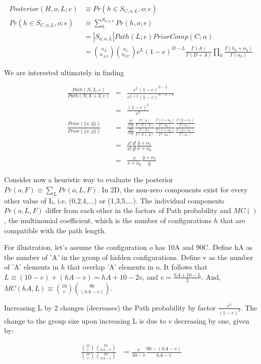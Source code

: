 \documentclass{article}
\begin{document}
\begin{align}
  Posterior(H,o,L;e) & \equiv Pr(h \in S_{C,o,L},o;e) \\
  Pr(h \in S_{C,o,L}, o; e) & \equiv \sum_h^{S_{a,o,L}} Pr(h, o; e) \nonumber \\
  & = |S_{a,o,L}| Path(L;e) PriorComp(C;\alpha) \nonumber \\
  & = {o_A \choose n_{AA}}{o_C \choose n_{CC}}
  e^L(1-e)^{D-L}
  \frac{\Gamma(A)}{\Gamma(D+A)}
  \prod_k \frac{\Gamma(h_k+\alpha_k)}{\Gamma(\alpha_k)}
\end{align}

We are interested ultimately in finding


\begin{eqnarray}
  \frac{Path(N,L,e)}{Path(N,L+2,e)}
  & = & \frac{e^L(1-e)^{N-L}}{e^{L+2}(1-e)^{N-L-2}} \nonumber \\
  & = & \frac{(1-e)^2}{e^2} \\[4ex]
  \frac{Prior(\{\check{x},\hat{y}\})}{Prior(\{x,y\})}
  & = &
    \frac{\frac{N!}{\check{x}!\hat{y}!}}{\frac{N!}{x!y!}}
    \frac{\frac{\Gamma(A)}{\Gamma(N+A)}}{\frac{\Gamma(A)}{\Gamma(N+A)}}
    \frac{
      \frac{\Gamma(\check{x}+\alpha_0)}{\Gamma(\alpha_0)}
    }{
      \frac{\Gamma(x+\alpha_0)}{\Gamma(\alpha_0)}
    }
    \frac{
      \frac{\Gamma(\hat{y}+\alpha_1)}{\Gamma(\alpha_1)}
    }{
      \frac{\Gamma(y+\alpha_1)}{\Gamma(\alpha_1)}
    } \nonumber \\[2ex]
    & = &
    \frac{x!}{\check{x}!}
    \frac{y!}{\hat{y}!}
    \frac{\hat{y}+\alpha_1}{x+\alpha_0} \nonumber \\
    & = &
    \frac{x}{x+\alpha_0}
    \frac{\hat{y}+\alpha_1}{\hat{y}}
\end{eqnarray}



Consider now a heuristic way to evaluate the posterior $Pr(o,F) \equiv
\sum_L Pr(o,L,F)$. In 2D, the non-zero components exist for every
other value of L, i.e. (0,2,4,...) or (1,3,5,...). The individual
components $Pr(o,L,F)$ differ from each other in the factors of Path
probability and $MC()$, the multinomial coefficient, which is the number
of configurations $h$ that are compatible with the path
length.

For illustration, let's assume the configuration $o$ has 10A and 90C.
Define hA as the number of 'A' in the group of hidden configurations.
Define v as the number of 'A' elements in $h$ that overlap 'A'
elements in o.  It follows that $L \equiv (10-v) + (hA-v) = hA + 10 -
2v$, and $v = \frac{hA + 10 - L}{2}$.  And, $MC(hA,L) \equiv {10
  \choose v}{90 \choose (hA-v)}$.

Increasing L by 2 changes (decreases) the Path probability by factor
$\frac{e^2}{(1-e)^2}$. The change to the group size upon increasing L
is due to $v$ decreasing by one, given by:

\begin{align}
  \frac{{10 \choose \check{v}}}{{10 \choose v}}
  \frac{{90 \choose hA-\check{v}}}{{90 \choose hA-v}} \nonumber
& =
  \frac{v}{10-\check{v}}
  \frac{90-(hA-v)}{hA-\check{v}}
\end{align}
\end{document}
